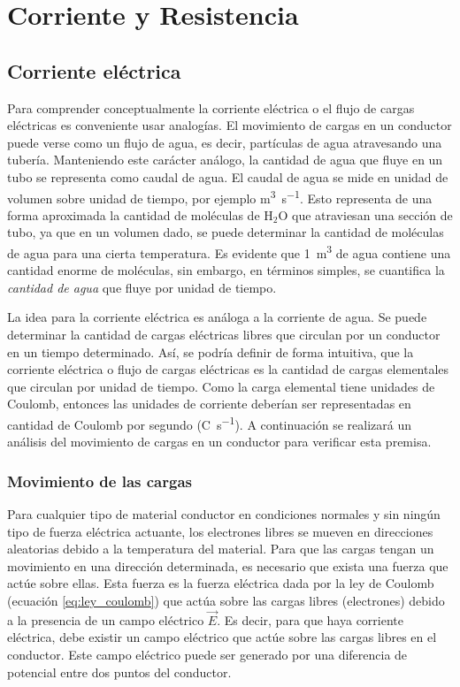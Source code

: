 \graphicspath{ {./images/2_direct_current/} }

\chapter{Corriente y Resistencia}

\section{Corriente eléctrica}

Para comprender conceptualmente la corriente eléctrica o el flujo de cargas eléctricas es conveniente usar analogías. El movimiento de cargas en un conductor puede verse como un flujo de agua, es decir, partículas de agua atravesando una tubería. Manteniendo este carácter análogo, la cantidad de agua que fluye en un tubo se representa como caudal de agua. El caudal de agua se mide en unidad de volumen sobre unidad de tiempo, por ejemplo \unit{\cubic\metre\per\second}. Esto representa de una forma aproximada la cantidad de moléculas de \(\text{H}_2\text{O}\) que atraviesan una sección de tubo, ya que en un volumen dado, se puede determinar la cantidad de moléculas de agua para una cierta temperatura. Es evidente que \qty{1}{\cubic\metre} de agua contiene una cantidad enorme de moléculas, sin embargo, en términos simples, se cuantifica la \emph{cantidad de agua} que fluye por unidad de tiempo.

La idea para la corriente eléctrica es análoga a la corriente de agua. Se puede determinar la cantidad de cargas eléctricas libres que circulan por un conductor en un tiempo determinado. Así, se podría definir de forma intuitiva, que la corriente eléctrica o flujo de cargas eléctricas es la cantidad de cargas elementales que circulan por unidad de tiempo. Como la carga elemental tiene unidades de Coulomb, entonces las unidades de corriente deberían ser representadas en cantidad de Coulomb por segundo (\unit{\coulomb\per\second}). A continuación se realizará un análisis del movimiento de cargas en un conductor para verificar esta premisa.

\subsection{Movimiento de las cargas}
\label{sec:movimiento_de_cargas}

Para cualquier tipo de material conductor en condiciones normales y sin ningún tipo de fuerza eléctrica actuante, los electrones libres se mueven en direcciones aleatorias debido a la temperatura del material. Para que las cargas tengan un movimiento en una dirección determinada, es necesario que exista una fuerza que actúe sobre ellas. Esta fuerza es la fuerza eléctrica dada por la ley de Coulomb (ecuación \ref{eq:ley_coulomb}) que actúa sobre las cargas libres (electrones) debido a la presencia de un campo eléctrico \(\vec{E}\). Es decir, para que haya corriente eléctrica, debe existir un campo eléctrico que actúe sobre las cargas libres en el conductor. Este campo eléctrico puede ser generado por una diferencia de potencial entre dos puntos del conductor.

